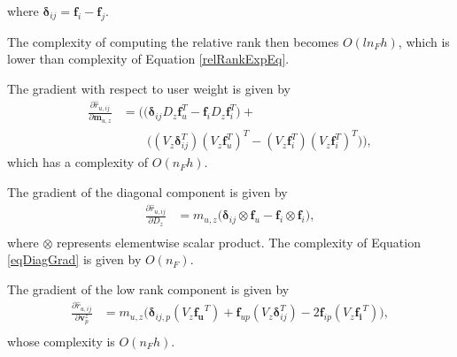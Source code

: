 where $\bm{\delta}_{ij} = \bm{f}_i-\bm{f}_j$.

The complexity of computing the relative rank then becomes $O(l n_F h)$, which
is lower than complexity of Equation \ref{relRankExpEq}.

The gradient with respect to user weight is given by
\begin{equation}
  \begin{split}
    \frac{\partial \hat{r}_{u,ij}}{\partial \bm{m}_{u,z}}  &=  \Bigg( 
   \Bigg( \bm{\delta}_{ij}D_z\bm{f}_u^T - \bm{f}_iD_z\bm{f}_i^T \Bigg) +  \\
  &\quad \quad \Bigg((V_z\bm{\delta}_{ij}^T)(V_z\bm{f}_u^T)^T -
  (V_z\bm{f}_i^T)(V_z\bm{f}_i^T)^T\Bigg) \Bigg), 
  \end{split}
\end{equation}
which has a complexity of $O(n_F h)$.

The gradient of the diagonal component is given by
\begin{equation} \label{eqDiagGrad}
  \begin{split}
    \frac{\partial \hat{r}_{u,ij}}{\partial D_z}  
    &= m_{u,z} \Big(\bm{\delta}_{ij} \otimes \bm{f}_u - \bm{f}_i \otimes
  \bm{f}_i \Big),\\
  \end{split}
\end{equation}
where $\otimes$ represents elementwise scalar product. The complexity of
Equation \ref{eqDiagGrad} is given by $O(n_F)$.

The gradient of the low rank component is given by
\begin{equation}
  \begin{split}
    \frac{\partial \hat{r}_{u,ij}}{\partial \bm{v}_p^z}  
    &= m_{u,z}\Big(\bm{\delta}_{ij,p} (V_z \bm{f_u}^T) +  \bm{f}_{up} (V_z
    \bm{\delta}_{ij}^T) - 2\bm{f}_{ip} (V_z \bm{f_i}^T) \Big),\\ 
  \end{split}
\end{equation}
whose complexity is $O(n_F h)$. 

